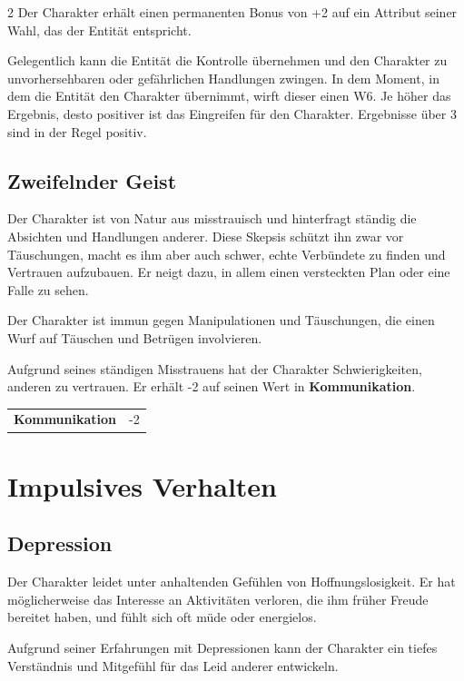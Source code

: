 \begin{multicols}{2}
    Der Charakter erhält einen permanenten Bonus von +2 auf ein Attribut seiner Wahl, das der Entität entspricht.

    Gelegentlich kann die Entität die Kontrolle übernehmen und den Charakter zu unvorhersehbaren oder gefährlichen Handlungen zwingen. In dem Moment, in dem die Entität den Charakter übernimmt, wirft dieser einen W6. Je höher das Ergebnis, desto positiver ist das Eingreifen für den Charakter. Ergebnisse über 3 sind in der Regel positiv.


    \subsection*{Zweifelnder Geist}

    Der Charakter ist von Natur aus misstrauisch und hinterfragt ständig die Absichten und Handlungen anderer. Diese Skepsis schützt ihn zwar vor Täuschungen, macht es ihm aber auch schwer, echte Verbündete zu finden und Vertrauen aufzubauen. Er neigt dazu, in allem einen versteckten Plan oder eine Falle zu sehen.

    Der Charakter ist immun gegen Manipulationen und Täuschungen, die einen Wurf auf Täuschen und Betrügen involvieren.

    Aufgrund seines ständigen Misstrauens hat der Charakter Schwierigkeiten, anderen zu vertrauen. Er erhält -2 auf seinen Wert in \textbf{Kommunikation}.

    \begin{tabular}{@{}ll@{}}
        \textbf{Kommunikation} & -2\\
    \end{tabular}

    \section{Impulsives Verhalten}

    \subsection*{Depression}

    Der Charakter leidet unter anhaltenden Gefühlen von Hoffnungslosigkeit. Er hat möglicherweise das Interesse an Aktivitäten verloren, die ihm früher Freude bereitet haben, und fühlt sich oft müde oder energielos.

    Aufgrund seiner Erfahrungen mit Depressionen kann der Charakter ein tiefes Verständnis und Mitgefühl für das Leid anderer entwickeln.


\end{multicols}
